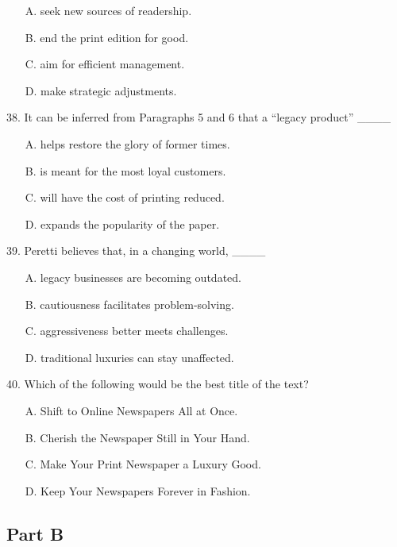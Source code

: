\documentclass[UTF8,11pt]{ctexart}
\begin{document}
\begin{itemize}[leftmargin=2em,itemsep=.2em,topsep=.4em]\item[A.] seek new sources of readership.
\item[B.] end the print edition for good.
\item[C.] aim for efficient management.
\item[D.] make strategic adjustments.
\end{itemize}

38. It can be inferred from Paragraphs 5 and 6 that a “legacy product” \_\_\_\_


\begin{itemize}[leftmargin=2em,itemsep=.2em,topsep=.4em]\item[A.] helps restore the glory of former times.
\item[B.] is meant for the most loyal customers.
\item[C.] will have the cost of printing reduced.
\item[D.] expands the popularity of the paper.
\end{itemize}

39. Peretti believes that, in a changing world, \_\_\_\_


\begin{itemize}[leftmargin=2em,itemsep=.2em,topsep=.4em]\item[A.] legacy businesses are becoming outdated.
\item[B.] cautiousness facilitates problem-solving.
\item[C.] aggressiveness better meets challenges.
\item[D.] traditional luxuries can stay unaffected.
\end{itemize}

40. Which of the following would be the best title of the text?


\begin{itemize}[leftmargin=2em,itemsep=.2em,topsep=.4em]\item[A.] Shift to Online Newspapers All at Once.
\item[B.] Cherish the Newspaper Still in Your Hand.
\item[C.] Make Your Print Newspaper a Luxury Good.
\item[D.] Keep Your Newspapers Forever in Fashion.
\end{itemize}

\subsection*{\textbf{Part B}}
\end{document}
